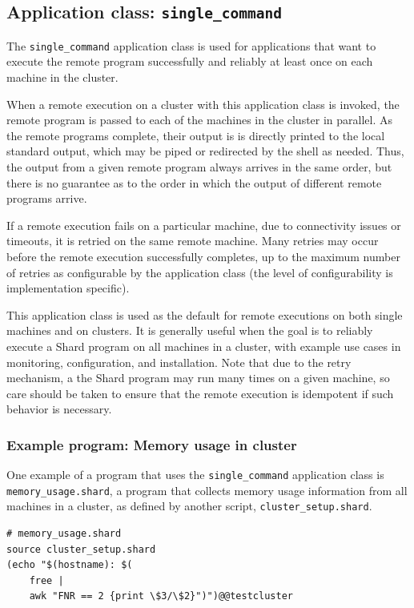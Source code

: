 \documentclass[twoside]{report}
\begin{document}
\subsection{Application class: \texttt{single\_command}}

The \texttt{single\_command} application class is used for applications that want to execute the remote program successfully and reliably at least once on each machine in the cluster.

When a remote execution on a cluster with this application class is invoked, the remote program is passed to each of the machines in the cluster in parallel.
As the remote programs complete, their output is is directly printed to the local standard output, which may be piped or redirected by the shell as needed.
Thus, the output from a given remote program always arrives in the same order, but there is no guarantee as to the order in which the output of different remote programs arrive.

If a remote execution fails on a particular machine, due to connectivity issues or timeouts, it is retried on the same remote machine.
Many retries may occur before the remote execution successfully completes, up to the maximum number of retries as configurable by the application class (the level of configurability is implementation specific).

This application class is used as the default for remote executions on both single machines and on clusters.
It is generally useful when the goal is to reliably execute a Shard program on all machines in a cluster, with example use cases in monitoring, configuration, and installation.
Note that due to the retry mechanism, a the Shard program may run many times on a given machine, so care should be taken to ensure that the remote execution is idempotent if such behavior is necessary.

\subsubsection{Example program: Memory usage in cluster}

One example of a program that uses the \texttt{single\_command} application class is \texttt{memory\_usage.shard}, a program that collects memory usage information from all machines in a cluster, as defined by another script, \texttt{cluster\_setup.shard}.

\begin{minipage}[c]{\textwidth-15pt}
  \begin{lstlisting}[language=Shard]
# memory_usage.shard
source cluster_setup.shard
(echo "$(hostname): $(
    free |
    awk "FNR == 2 {print \$3/\$2}")")@@testcluster
\end{lstlisting}
  \smallskip
\end{minipage}
\end{document}

